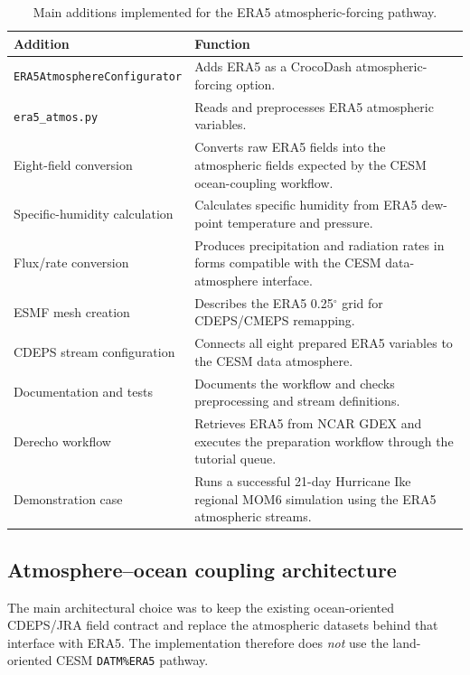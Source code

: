\documentclass[11pt]{article}
\newcommand{\code}[1]{\texttt{#1}}
\begin{document}
\begin{table}[htbp]
\centering
\caption{Main additions implemented for the ERA5 atmospheric-forcing pathway.}
\label{tab:additions}
\begin{tabularx}{\textwidth}{@{}L{0.31\textwidth}Y@{}}
\toprule
\textbf{Addition} & \textbf{Function} \\
\midrule
\code{ERA5AtmosphereConfigurator} & Adds ERA5 as a CrocoDash atmospheric-forcing option. \\
\code{era5\_atmos.py} & Reads and preprocesses ERA5 atmospheric variables. \\
Eight-field conversion & Converts raw ERA5 fields into the atmospheric fields expected by the CESM ocean-coupling workflow. \\
Specific-humidity calculation & Calculates specific humidity from ERA5 dew-point temperature and pressure. \\
Flux/rate conversion & Produces precipitation and radiation rates in forms compatible with the CESM data-atmosphere interface. \\
ESMF mesh creation & Describes the ERA5 0.25$^{\circ}$ grid for CDEPS/CMEPS remapping. \\
CDEPS stream configuration & Connects all eight prepared ERA5 variables to the CESM data atmosphere. \\
Documentation and tests & Documents the workflow and checks preprocessing and stream definitions. \\
Derecho workflow & Retrieves ERA5 from NCAR GDEX and executes the preparation workflow through the tutorial queue. \\
Demonstration case & Runs a successful 21-day Hurricane Ike regional MOM6 simulation using the ERA5 atmospheric streams. \\
\bottomrule
\end{tabularx}
\end{table}

\subsection{Atmosphere--ocean coupling architecture}

The main architectural choice was to keep the existing ocean-oriented CDEPS/JRA field contract and replace the atmospheric datasets behind that interface with ERA5. The implementation therefore does \emph{not} use the land-oriented CESM \code{DATM\%ERA5} pathway.
\end{document}
